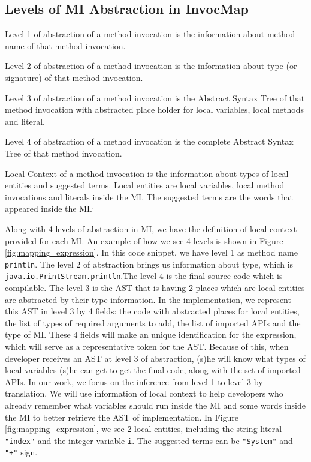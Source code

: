 \subsection{Levels of MI Abstraction in InvocMap}
\begin{definition}
Level 1 of abstraction of a method invocation is the information about method name of that method invocation.
\end{definition}
\begin{definition}
Level 2 of abstraction of a method invocation is the information about type (or signature) of that method invocation.
\end{definition}
\begin{definition}
Level 3 of abstraction of a method invocation is the Abstract Syntax Tree of that method invocation with abstracted place holder for local variables, local methods and literal.
\end{definition}
\begin{definition}
Level 4 of abstraction of a method invocation is the complete Abstract Syntax Tree of that method invocation.
\end{definition}

\begin{definition}
Local Context of a method invocation is the information about types of local entities and suggested terms. Local entities are local variables, local method invocations and literals inside the MI. The suggested terms are the words that appeared inside the MI.`
\end{definition}

Along with 4 levels of abstraction in MI, we have the definition of local context provided for each MI. An example of how we see 4 levels is shown in Figure \ref{fig:mapping_expression}. In this code snippet, we have level 1 as method name \texttt{println}. The level 2 of abstraction brings us information about type, which is \texttt{java.io.PrintStream.println}.The level 4 is the final source code which is compilable. The level 3 is the AST that is having 2 places which are local entities are abstracted by their type information. In the implementation, we represent this AST in level 3 by 4 fields: the code with abstracted places for local entities, the list of types of required arguments to add, the list of imported APIs and the type of MI. These 4 fields will make an unique identification for the expression, which will serve as a representative token for the AST. Because of this, when developer receives an AST at level 3 of abstraction, (s)he will know what types of local variables (s)he can get to get the final code, along with the set of imported APIs. In our work, we focus on the inference from level 1 to level 3 by translation.
We will use information of local context to help developers who already remember what variables should run inside the MI and some words inside the MI to better retrieve the AST of implementation. In Figure \ref{fig:mapping_expression}, we see 2 local entities, including the string literal \texttt{"index"} and the integer variable \texttt{i}. The suggested terms can be \texttt{"System"} and \texttt{"+"} sign. 



